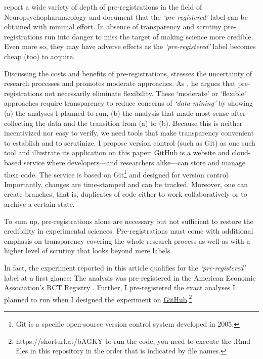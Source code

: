 \documentclass[
  authoryear,
  review,
  3p,
  onecolumn]{elsarticle}
\begin{document}
\citet{WaldronAllen2022} report a wide variety of depth of
pre-registrations in the field of Neuropsychopharmacology and document
that the \emph{`pre-registered'} label can be obtained with minimal
effort. In absence of transparency and scrutiny pre-registrations run
into danger to miss the target of making science more credible. Even
more so, they may have adverse effects as the \emph{`pre-registered'}
label becomes cheap (too) to acquire.

Discussing the costs and benefits of pre-registrations,
\citet{Olken2015} stresses the uncertainty of research processes and
promotes moderate approaches. As \citet{WaldronAllen2022}, he argues
that pre-registrations not necessarily eliminate flexibility. These
`moderate' or `flexible' approaches require transparency to reduce
concerns of \emph{`data-mining'} \citep[ p.~61]{Olken2015} by showing
(a) the analyses I planned to run, (b) the analysis that made most sense
after collecting the data and the transition from (a) to (b). Because
this is neither incentivized nor easy to verify, we need tools that make
transparency convenient to establish and to scrutinize. I propose
version control (such as Git) as one such tool and illustrate its
application on this paper: GitHub is a website and cloud-based service
where developers---and researchers alike---can store and manage their
code. The service is based on Git\footnote{Git is a specific open-source
  version control system developed in 2005.} and designed for version
control. Importantly, changes are time-stamped and can be tracked.
Moreover, one can create branches, that is, duplicates of code either to
work collaboratively or to archive a certain state.

To sum up, pre-registrations alone are necessary but not sufficient to
restore the credibility in experimental sciences. Pre-registrations must
come with additional emphasis on transparency covering the whole
research process as well as with a higher level of scrutiny that looks
beyond mere labels.

In fact, the experiment reported in this article qualifies for the
\emph{`pre-registered'} label at a first glance: The analysis was
pre-registered in the American Economic Association's RCT Registry
\citep{preregistration}. Further, I pre-registered the exact analyses I
planned to run when I designed the experiment on
\href{https://shorturl.at/bAGKY}{GitHub}.\footnote{https://shorturl.at/bAGKY
  to run the code, you need to execute the .Rmd files in this repository
  in the order that is indicated by file names.}
\end{document}

